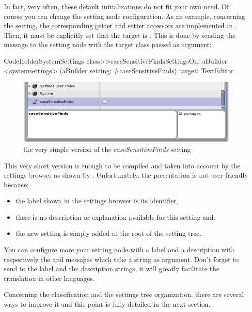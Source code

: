 \documentclass[a4paper,10pt,twoside]{book}
\begin{document}
In fact, very often, these default initializations do not fit your own need. Of course you can change the setting node configuration. As an example, concerning the  setting, the corresponding getter and setter accessors are implemented in . Then, it must be explicitly set that the target is . This is done by sending the message  to the setting node with the target class  passed as argument:
\begin{code}{}
CodeHolderSystemSettings class>>caseSensitiveFindsSettingsOn: aBuilder
	<systemsettings>
	(aBuilder setting: #caseSensitiveFinds) 
		target: TextEditor
\end{code}
\begin{figure}[tbh]
\begin{center}
\includegraphics[scale=0.4]{caseSensitiveFinds_setting_declaration2}
\caption{the very simple version of the \textit{caseSensitiveFinds} setting}
\end{center}
\end{figure}
This very short version is enough to be compiled and taken into account by the settings browser as shown by .
Unfortunately, the presentation is not user-friendly because:
\begin{itemize}
\item the label shown in the settings browser is its identifier,
\item there is no description or explanation available for this setting and,
\item the new setting is simply added at the root of the setting tree. 
\end{itemize}
You can configure more your setting node with a label and a description with respectively the  and  messages which take a string as argument. Don't forget to send  to the label and the description strings, it will greatly facilitate the translation in other languages.

Concerning the classification and the settings tree organization, there are several ways to improve it and this point is fully detailed in the next section.
\end{document}
